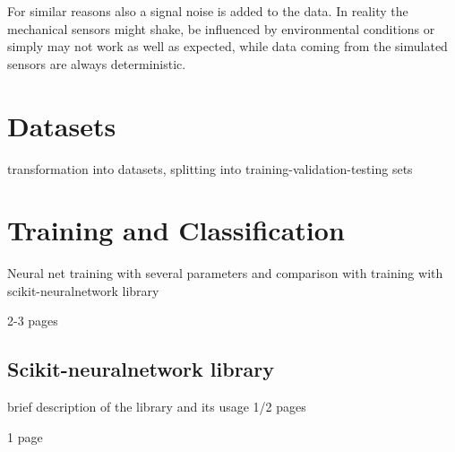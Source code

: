 For similar reasons also a signal noise is added to the data. In reality the mechanical sensors might shake, be influenced by environmental conditions or simply may not work as well as expected, while data coming from the simulated sensors are always deterministic.

\section{Datasets}
transformation into datasets, splitting into training-validation-testing sets

\section{Training and Classification}

Neural net training with several parameters and comparison with training with scikit-neuralnetwork library

2-3 pages

\subsection{Scikit-neuralnetwork library}
brief description of the library and its usage 1/2 pages

1 page